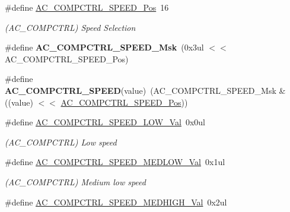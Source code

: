\begin{DoxyCompactItemize}
\item 
\hypertarget{group___s_a_m_l21___a_c_gaf0d15bf42764457190c7bf06e67c0d9c}{}\#define \hyperlink{group___s_a_m_l21___a_c_gaf0d15bf42764457190c7bf06e67c0d9c}{A\+C\+\_\+\+C\+O\+M\+P\+C\+T\+R\+L\+\_\+\+S\+P\+E\+E\+D\+\_\+\+Pos}~16\label{group___s_a_m_l21___a_c_gaf0d15bf42764457190c7bf06e67c0d9c}

\begin{DoxyCompactList}\small\item\em (A\+C\+\_\+\+C\+O\+M\+P\+C\+T\+R\+L) Speed Selection \end{DoxyCompactList}\item 
\hypertarget{group___s_a_m_l21___a_c_gaf05d0303fef7ff91191403531789c545}{}\#define {\bfseries A\+C\+\_\+\+C\+O\+M\+P\+C\+T\+R\+L\+\_\+\+S\+P\+E\+E\+D\+\_\+\+Msk}~(0x3ul $<$$<$ A\+C\+\_\+\+C\+O\+M\+P\+C\+T\+R\+L\+\_\+\+S\+P\+E\+E\+D\+\_\+\+Pos)\label{group___s_a_m_l21___a_c_gaf05d0303fef7ff91191403531789c545}

\item 
\hypertarget{group___s_a_m_l21___a_c_gaf4d4ee387598d65b50b788e3663055f2}{}\#define {\bfseries A\+C\+\_\+\+C\+O\+M\+P\+C\+T\+R\+L\+\_\+\+S\+P\+E\+E\+D}(value)~(A\+C\+\_\+\+C\+O\+M\+P\+C\+T\+R\+L\+\_\+\+S\+P\+E\+E\+D\+\_\+\+Msk \& ((value) $<$$<$ \hyperlink{group___s_a_m_l21___a_c_gaf0d15bf42764457190c7bf06e67c0d9c}{A\+C\+\_\+\+C\+O\+M\+P\+C\+T\+R\+L\+\_\+\+S\+P\+E\+E\+D\+\_\+\+Pos}))\label{group___s_a_m_l21___a_c_gaf4d4ee387598d65b50b788e3663055f2}

\item 
\hypertarget{group___s_a_m_l21___a_c_ga1a8973ca4af7dd2e1da973968af7e145}{}\#define \hyperlink{group___s_a_m_l21___a_c_ga1a8973ca4af7dd2e1da973968af7e145}{A\+C\+\_\+\+C\+O\+M\+P\+C\+T\+R\+L\+\_\+\+S\+P\+E\+E\+D\+\_\+\+L\+O\+W\+\_\+\+Val}~0x0ul\label{group___s_a_m_l21___a_c_ga1a8973ca4af7dd2e1da973968af7e145}

\begin{DoxyCompactList}\small\item\em (A\+C\+\_\+\+C\+O\+M\+P\+C\+T\+R\+L) Low speed \end{DoxyCompactList}\item 
\hypertarget{group___s_a_m_l21___a_c_gab57cb133175ab6c58750e1b329629988}{}\#define \hyperlink{group___s_a_m_l21___a_c_gab57cb133175ab6c58750e1b329629988}{A\+C\+\_\+\+C\+O\+M\+P\+C\+T\+R\+L\+\_\+\+S\+P\+E\+E\+D\+\_\+\+M\+E\+D\+L\+O\+W\+\_\+\+Val}~0x1ul\label{group___s_a_m_l21___a_c_gab57cb133175ab6c58750e1b329629988}

\begin{DoxyCompactList}\small\item\em (A\+C\+\_\+\+C\+O\+M\+P\+C\+T\+R\+L) Medium low speed \end{DoxyCompactList}\item 
\hypertarget{group___s_a_m_l21___a_c_gaa385073c0d8d512d40202aa1b096da16}{}\#define \hyperlink{group___s_a_m_l21___a_c_gaa385073c0d8d512d40202aa1b096da16}{A\+C\+\_\+\+C\+O\+M\+P\+C\+T\+R\+L\+\_\+\+S\+P\+E\+E\+D\+\_\+\+M\+E\+D\+H\+I\+G\+H\+\_\+\+Val}~0x2ul\label{group___s_a_m_l21___a_c_gaa385073c0d8d512d40202aa1b096da16}


\end{DoxyCompactItemize}
